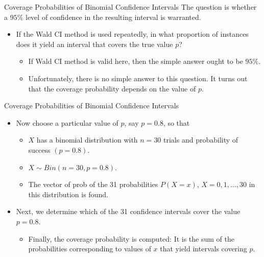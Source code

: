 \documentclass[
  ignorenonframetext,
]{beamer}
\providecommand{\tightlist}{%
  \setlength{\itemsep}{0pt}\setlength{\parskip}{0pt}}
\begin{document}
\begin{frame}{Coverage Probabilities of Binomial Confidence Intervals}
\label{coverage-probabilities-of-binomial-confidence-intervals-1}
The question is whether a \(95\%\) level of confidence in the resulting
interval is warranted.

\begin{itemize}
\item
  If the Wald CI method is used repeatedly, in what proportion of
  instances does it yield an interval that covers the true value \(p\)?

  \begin{itemize}
  \tightlist
  \item
    If Wald CI method is valid here, then the simple answer ought to be
    \(95\%\).
  \item
    Unfortunately, there is no simple answer to this question. It turns
    out that the coverage probability depends on the value of \(p\).
  \end{itemize}
\end{itemize}
\end{frame}

\begin{frame}{Coverage Probabilities of Binomial Confidence Intervals}
\label{coverage-probabilities-of-binomial-confidence-intervals-2}
\begin{itemize}
\item
  Now choose a particular value of \(p\), say \(p=0.8\), so that

  \begin{itemize}
  \tightlist
  \item
    \(X\) has a binomial distribution with \(n=30\) trials and
    probability of success \((p=0.8)\).
  \item
    \(X\sim Bin(n=30, p=0.8)\).
  \item
    The vector of prob of the 31 probabilities \(P(X=x)\),
    \(X=0, 1, \ldots, 30\) in this distribution is found.
  \end{itemize}
\item
  Next, we determine which of the 31 confidence intervals cover the
  value \(p=0.8\).

  \begin{itemize}
  \tightlist
  \item
    Finally, the coverage probability is computed: It is the sum of the
    probabilities corresponding to values of \(x\) that yield intervals
    covering \(p\).
  \end{itemize}
\end{itemize}
\end{frame}
\end{document}
